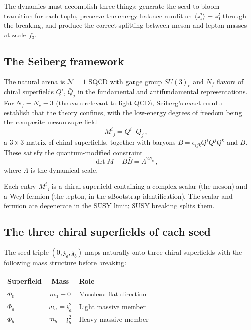 \documentclass[12pt,a4paper]{article}
\newcommand{\zch}{\mathfrak{z}}
\begin{document}
The dynamics must accomplish three things: generate the seed-to-bloom 
transition for each tuple, preserve the energy-balance condition 
$\langle z_k^2\rangle = z_0^2$ through the breaking, and produce 
the correct splitting between meson and lepton masses at scale $f_\pi$.

\subsection{The Seiberg framework}

The natural arena is $\mathcal{N}=1$ SQCD with gauge group $SU(3)_c$ 
and $N_f$ flavors of chiral superfields $Q^i$, $\bar{Q}_j$ in the 
fundamental and antifundamental representations. For $N_f = N_c = 3$ 
(the case relevant to light QCD), Seiberg's exact results 
\cite{Seiberg1995} establish that the theory confines, with the 
low-energy degrees of freedom being the composite meson superfield
\begin{equation}
M^i{}_j = Q^i \cdot \bar{Q}_j\,,
\end{equation}
a $3\times 3$ matrix of chiral superfields, together with baryons 
$B = \epsilon_{ijk}Q^iQ^jQ^k$ and $\bar{B}$. These satisfy the 
quantum-modified constraint
\begin{equation}
\label{eq:seiberg}
\det M - B\bar{B} = \Lambda^{2N_c}\,,
\end{equation}
where $\Lambda$ is the dynamical scale.

Each entry $M^i{}_j$ is a chiral superfield containing a complex 
scalar (the meson) and a Weyl fermion (the lepton, in the sBootstrap 
identification). The scalar and fermion are degenerate in the SUSY 
limit; SUSY breaking splits them.

\subsection{The three chiral superfields of each seed}

The seed triple $(0, \zch_a, \zch_b)$ maps naturally onto three 
chiral superfields with the following mass structure before breaking:

\begin{center}
\begin{tabular}{lcl}
\toprule
Superfield & Mass & Role \\
\midrule
$\Phi_0$ & $m_0 = 0$ & Massless: flat direction \\
$\Phi_a$ & $m_a = \zch_a^2$ & Light massive member \\
$\Phi_b$ & $m_b = \zch_b^2$ & Heavy massive member \\
\bottomrule
\end{tabular}
\end{center}
\end{document}
